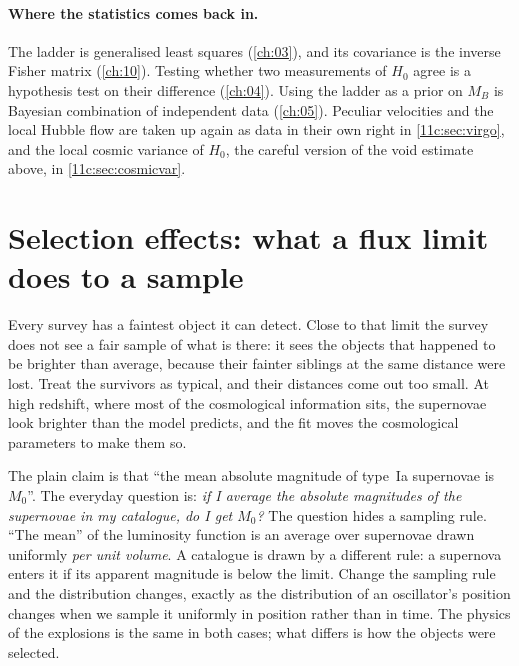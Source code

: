 \paragraph{Where the statistics comes back in.} The ladder is generalised least squares (\cref{ch:03}), and its covariance is the inverse Fisher matrix (\cref{ch:10}). Testing whether two measurements of $H_0$ agree is a hypothesis test on their difference (\cref{ch:04}). Using the ladder as a prior on $M_B$ is Bayesian combination of independent data (\cref{ch:05}). Peculiar velocities and the local Hubble flow are taken up again as data in their own right in \cref{11c:sec:virgo}, and the local cosmic variance of $H_0$, the careful version of the void estimate above, in \cref{11c:sec:cosmicvar}.
\section{Selection effects: what a flux limit does to a sample}
\label{T2b:sec:malmquist}

Every survey has a faintest object it can detect. Close to that limit the survey does not see a fair sample of what is there: it sees the objects that happened to be brighter than average, because their fainter siblings at the same distance were lost. Treat the survivors as typical, and their distances come out too small. At high redshift, where most of the cosmological information sits, the supernovae look brighter than the model predicts, and the fit moves the cosmological parameters to make them so.

The plain claim is that ``the mean absolute magnitude of type~Ia supernovae is $M_0$''. The everyday question is: \emph{if I average the absolute magnitudes of the supernovae in my catalogue, do I get $M_0$?} The question hides a sampling rule. ``The mean'' of the luminosity function is an average over supernovae drawn uniformly \emph{per unit volume}. A catalogue is drawn by a different rule: a supernova enters it if its apparent magnitude is below the limit. Change the sampling rule and the distribution changes, exactly as the distribution of an oscillator's position changes when we sample it uniformly in position rather than in time. The physics of the explosions is the same in both cases; what differs is how the objects were selected.

